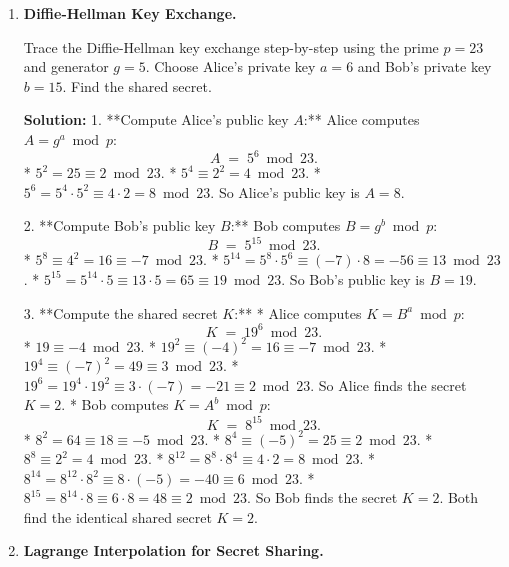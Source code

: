 \documentclass[12pt, a4paper]{book}
\begin{document}
\begin{problembox}
\begin{enumerate}[label=\textbf{E\arabic*.}]
  \item \textbf{Diffie-Hellman Key Exchange.}
  
        Trace the Diffie-Hellman key exchange step-by-step using the prime $p = 23$ and generator $g = 5$.
        Choose Alice's private key $a = 6$ and Bob's private key $b = 15$. Find the shared secret.
        
        \textbf{Solution:}
        1. **Compute Alice's public key $A$:**
           Alice computes $A = g^a \bmod p$:
           \[
             A \;=\; 5^6 \bmod 23.
           \]
           * $5^2 = 25 \equiv 2 \bmod 23$.
           * $5^4 \equiv 2^2 = 4 \bmod 23$.
           * $5^6 = 5^4 \cdot 5^2 \equiv 4 \cdot 2 = 8 \bmod 23$.
           So Alice's public key is $A = 8$.
           
        2. **Compute Bob's public key $B$:**
           Bob computes $B = g^b \bmod p$:
           \[
             B \;=\; 5^{15} \bmod 23.
           \]
           * $5^8 \equiv 4^2 = 16 \equiv -7 \bmod 23$.
           * $5^{14} = 5^8 \cdot 5^6 \equiv (-7) \cdot 8 = -56 \equiv 13 \bmod 23$.
           * $5^{15} = 5^{14} \cdot 5 \equiv 13 \cdot 5 = 65 \equiv 19 \bmod 23$.
           So Bob's public key is $B = 19$.
           
        3. **Compute the shared secret $K$:**
           * Alice computes $K = B^a \bmod p$:
             \[
               K \;=\; 19^6 \bmod 23.
             \]
             * $19 \equiv -4 \bmod 23$.
             * $19^2 \equiv (-4)^2 = 16 \equiv -7 \bmod 23$.
             * $19^4 \equiv (-7)^2 = 49 \equiv 3 \bmod 23$.
             * $19^6 = 19^4 \cdot 19^2 \equiv 3 \cdot (-7) = -21 \equiv 2 \bmod 23$.
             So Alice finds the secret $K = 2$.
           * Bob computes $K = A^b \bmod p$:
             \[
               K \;=\; 8^{15} \bmod 23.
             \]
             * $8^2 = 64 \equiv 18 \equiv -5 \bmod 23$.
             * $8^4 \equiv (-5)^2 = 25 \equiv 2 \bmod 23$.
             * $8^8 \equiv 2^2 = 4 \bmod 23$.
             * $8^{12} = 8^8 \cdot 8^4 \equiv 4 \cdot 2 = 8 \bmod 23$.
             * $8^{14} = 8^{12} \cdot 8^2 \equiv 8 \cdot (-5) = -40 \equiv 6 \bmod 23$.
             * $8^{15} = 8^{14} \cdot 8 \equiv 6 \cdot 8 = 48 \equiv 2 \bmod 23$.
             So Bob finds the secret $K = 2$.
        Both find the identical shared secret $K = 2$.
        
  \item \textbf{Lagrange Interpolation for Secret Sharing.}
  

\end{enumerate}
\end{problembox}
\end{document}
